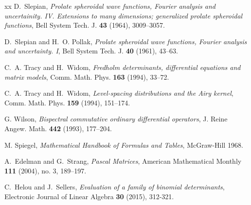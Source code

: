 \documentclass[11pt]{amsart}
\theoremstyle{plain}
\theoremstyle{named}
\begin{document}
\begin{thebibliography}{xx}
 D.~Slepian, {\em{Prolate spheroidal wave functions, {F}ourier analysis and uncertainity. {IV}. {E}xtensions to many dimensions; generalized prolate
spheroidal functions}}, Bell System Tech. J. {\bf{43}} (1964), 3009--3057.

 D.~Slepian and H.~O. Pollak, {\em{Prolate spheroidal wave functions, {F}ourier analysis and
uncertainty. {I}}},  Bell System Tech. J. {\bf{40}} (1961), 43--63.

 C.~A. Tracy and H.~Widom, {\em{Fredholm determinants, differential equations and matrix models}}, 
Comm. Math. Phys. {\bf{163}} (1994), 33--72.

 C.~A. Tracy and H.~Widom, {\em{Level-spacing distributions and the {A}iry kernel}}, 
Comm. Math. Phys. {\bf{159}} (1994), 151--174.

 G. Wilson, {\em{Bispectral commutative ordinary differential operators}}, J. Reine Angew. Math. {\bf{442}} (1993), 177--204.



 M. Spiegel, {\em{Mathematical Handbook of Formulas and Tables}}, McGraw-Hill 1968.


 A.~Edelman and G.~Strang, {\em{Pascal Matrices}}, American Mathematical Monthly {\bf{111}} (2004), no. 3, 189–197. 

 C.~Helou and J.~Sellers,
{\em{Evaluation of a family of binomial determinants}},  Electronic Journal of Linear Algebra {\bf{30}} (2015), 312-321.


\end{thebibliography}
\end{document}
